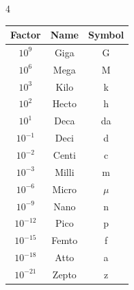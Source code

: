 \documentclass[10pt, landscape]{article}
\begin{document}
\begin{multicols}{4}
\begin{enumerate}
\begin{center}
        \begin{tabular}{c|c|c}
            \textbf{Factor} & \textbf{Name} & \textbf{Symbol} \\ \hline
            $10^{9}$   & Giga  & G \\
            $10^{6}$   & Mega  & M \\
            $10^{3}$   & Kilo  & k \\
            $10^{2}$   & Hecto & h \\
            $10^{1}$   & Deca  & da \\
            $10^{-1}$  & Deci  & d \\
            $10^{-2}$  & Centi & c \\
            $10^{-3}$  & Milli & m \\
            $10^{-6}$  & Micro & $\mu$ \\
            $10^{-9}$  & Nano  & n \\
            $10^{-12}$ & Pico  & p \\
            $10^{-15}$ & Femto & f \\
            $10^{-18}$ & Atto  & a \\
            $10^{-21}$ & Zepto & z
        \end{tabular}
    \end{center}

\end{enumerate}

\end{multicols}

\end{document}
